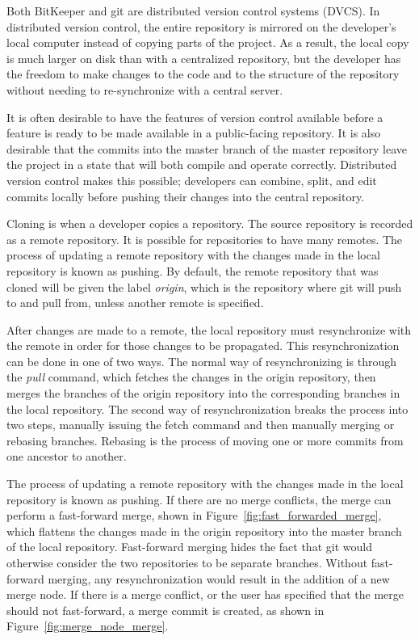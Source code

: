 Both BitKeeper and git are distributed version control systems (DVCS).
In distributed version control, the entire repository is mirrored on
the developer's local computer instead of copying parts of the project.
As a result, the local copy is much larger on disk than with a
centralized repository, but the developer has the freedom to make
changes to the code and to the
structure of the repository without needing to re-synchronize with a
central server.

It is often desirable to have the features of version control available
before a feature is ready to be made available in a public-facing
repository.
It is also desirable that the commits into the master branch of the
master repository leave the project in a state that will both compile
and operate correctly.
Distributed version control makes this possible; developers can combine,
split, and edit commits locally before pushing their changes into the
central repository.

Cloning is when a developer copies a repository.
The source repository is recorded as a remote repository.
It is possible for repositories to have many remotes.
The process of updating a remote repository with the changes made in the
local repository is known as pushing.
By default, the remote repository that was cloned will be given the
label \textit{origin}, which is the repository where git will push to
and pull from, unless another remote is specified.

After changes are made to a remote, the local repository must
resynchronize with the remote in order for those changes to be
propagated.
This resynchronization can be done in one of two ways.
The normal way of resynchronizing is through the \textit{pull} command,
which fetches the changes in the origin repository, then merges the
branches of the origin repository into the corresponding branches in the
local repository.
The second way of resynchronization breaks the process into two steps,
manually issuing the fetch command and then manually merging or rebasing
branches.
Rebasing is the process of moving one or more commits from one ancestor
to another.

The process of updating a remote repository with the changes made in
the local repository is known as pushing.
If there are no merge conflicts, the merge can perform a fast-forward
merge, shown in Figure~\ref{fig:fast_forwarded_merge},
which flattens the changes made in the origin repository into the
master branch of the local repository.
Fast-forward merging hides the fact that git would otherwise consider
the two repositories to be separate branches.
Without fast-forward merging, any resynchronization would result in the
addition of a new merge node.
If there is a merge conflict, or the user has specified that the merge
should not fast-forward, a merge commit is created, as shown in
Figure~\ref{fig:merge_node_merge}.

